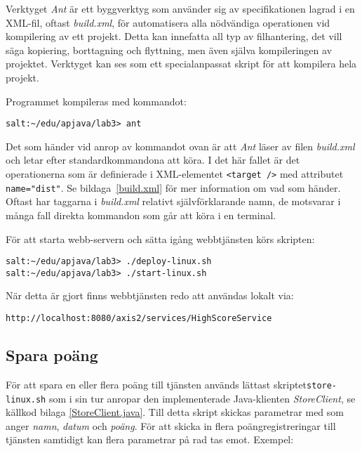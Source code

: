 \documentclass[a4paper, 12pt]{article}
\begin{document}
Verktyget \textit{Ant} är ett byggverktyg som använder sig av
specifikationen lagrad i en XML-fil, oftast \textit{build.xml}, för
automatisera alla nödvändiga operationen vid kompilering av ett
projekt. Detta kan innefatta all typ av filhantering, det vill säga
kopiering, borttagning och flyttning, men även själva kompileringen av
projektet. Verktyget kan ses som ett specialanpassat skript för att
kompilera hela projekt.

Programmet kompileras med kommandot:\\
\begin{footnotesize}
\verb!salt:~/edu/apjava/lab3> ant!
\end{footnotesize}

Det som händer vid anrop av kommandot ovan är att \textit{Ant} läser
av filen \textit{build.xml} och letar efter standardkommandona att
köra. I det här fallet är det operationerna som är definierade i
XML-elementet \verb!<target />! med attributet \verb!name="dist"!. Se
bildaga~\ref{build.xml} för mer information om vad som händer. Oftast
har taggarna i \textit{build.xml} relativt självförklarande namn, de
motsvarar i många fall direkta kommandon som går att köra i en
terminal.

För att starta webb-servern och sätta igång webbtjänsten körs skripten:\\
\begin{footnotesize}
\verb!salt:~/edu/apjava/lab3> ./deploy-linux.sh !\\
\verb!salt:~/edu/apjava/lab3> ./start-linux.sh !
\end{footnotesize}

När detta är gjort finns webbtjänsten redo att användas lokalt via:\\
\begin{footnotesize}
\verb!http://localhost:8080/axis2/services/HighScoreService!
\end{footnotesize}

\subsection{Spara poäng}

För att spara en eller flera poäng till tjänsten används lättast
skriptet\linebreak \texttt{store-linux.sh} som i sin tur anropar den
implementerade Java-klienten \textit{StoreClient}, se källkod bilaga
\ref{StoreClient.java}. Till detta skript skickas parametrar med som
anger \textit{namn}, \textit{datum} och \textit{poäng}. För att skicka
in flera poängregistreringar till tjänsten samtidigt kan flera
parametrar på rad tas emot. Exempel:
\end{document}
